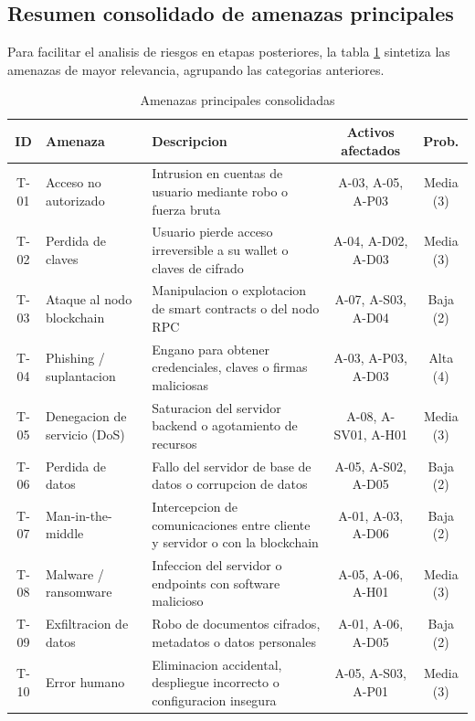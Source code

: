 \documentclass[11pt, a4paper]{article}
\begin{document}
\subsection{Resumen consolidado de amenazas principales}

Para facilitar el analisis de riesgos en etapas posteriores, la tabla \ref{tab:amenazas} sintetiza las amenazas de mayor relevancia, agrupando las categorias anteriores.

\begin{table}[H]
\centering
\renewcommand{\arraystretch}{1.4}
\small
\begin{tabular}{|c|l|p{4cm}|c|c|}
\hline
\textbf{ID} & \textbf{Amenaza} & \textbf{Descripcion} & \textbf{Activos afectados} & \textbf{Prob.} \\
\hline
T-01 & Acceso no autorizado & Intrusion en cuentas de usuario mediante robo o fuerza bruta & A-03, A-05, A-P03 & Media (3) \\
\hline
T-02 & Perdida de claves & Usuario pierde acceso irreversible a su wallet o claves de cifrado & A-04, A-D02, A-D03 & Media (3) \\
\hline
T-03 & Ataque al nodo blockchain & Manipulacion o explotacion de smart contracts o del nodo RPC & A-07, A-S03, A-D04 & Baja (2) \\
\hline
T-04 & Phishing / suplantacion & Engano para obtener credenciales, claves o firmas maliciosas & A-03, A-P03, A-D03 & Alta (4) \\
\hline
T-05 & Denegacion de servicio (DoS) & Saturacion del servidor backend o agotamiento de recursos & A-08, A-SV01, A-H01 & Media (3) \\
\hline
T-06 & Perdida de datos & Fallo del servidor de base de datos o corrupcion de datos & A-05, A-S02, A-D05 & Baja (2) \\
\hline
T-07 & Man-in-the-middle & Intercepcion de comunicaciones entre cliente y servidor o con la blockchain & A-01, A-03, A-D06 & Baja (2) \\
\hline
T-08 & Malware / ransomware & Infeccion del servidor o endpoints con software malicioso & A-05, A-06, A-H01 & Media (3) \\
\hline
T-09 & Exfiltracion de datos & Robo de documentos cifrados, metadatos o datos personales & A-01, A-06, A-D05 & Baja (2) \\
\hline
T-10 & Error humano & Eliminacion accidental, despliegue incorrecto o configuracion insegura & A-05, A-S03, A-P01 & Media (3) \\
\hline
\end{tabular}
\caption{Amenazas principales consolidadas}
\label{tab:amenazas}
\end{table}
\end{document}
